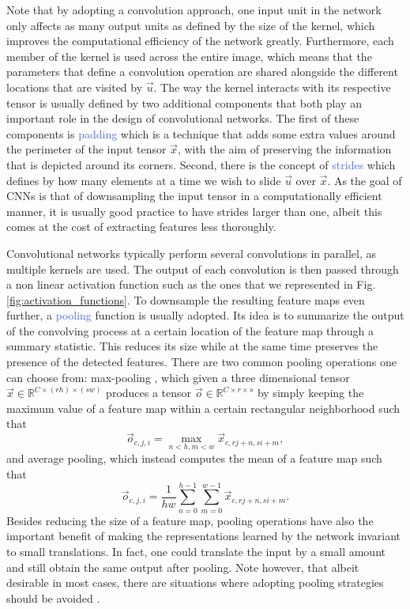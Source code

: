 Note that by adopting a convolution approach, one input unit in the network only affects as many output units as defined by the size of the kernel, which improves the computational efficiency of the network greatly. Furthermore, each member of the kernel is used across the entire image, which means that the parameters that define a convolution operation are shared alongside the different locations that are visited by $\vec{u}$. The way the kernel interacts with its respective tensor is usually defined by two additional components that both play an important role in the design of convolutional networks. The first of these components is \textcolor{RoyalBlue}{padding} which is a technique that adds some extra values around the perimeter of the input tensor $\vec{x}$, with the aim of preserving the information that is depicted around its corners. Second, there is the concept of \textcolor{RoyalBlue}{strides} which defines by how many elements at a time we wish to slide $\vec{u}$ over $\vec{x}$. As the goal of CNNs is that of downsampling the input tensor in a computationally efficient manner, it is usually good practice to have strides larger than one, albeit this comes at the cost of extracting features less thoroughly. 

Convolutional networks typically perform several convolutions in parallel, as multiple kernels are used. The output of each convolution is then passed through a non linear activation function such as the ones that we represented in Fig. \ref{fig:activation_functions}. To downsample the resulting feature maps even further, a \textcolor{RoyalBlue}{pooling} function is usually adopted. Its idea is to summarize the output of the convolving process at a certain location of the feature map through a summary statistic. This reduces its size while at the same time preserves the presence of the detected features. There are two common pooling operations one can choose from: max-pooling \cite{zhou1988computation}, which given a three dimensional tensor $\vec{x}\in\mathds{R}^{C\times(rh)\times(sw)}$ produces a tensor $\vec{o}\in\mathds{R}^{C\times r\times s}$ by simply keeping the maximum value of a feature map within a certain rectangular neighborhood such that 
\begin{equation}
	\vec{o}_{c,j,i} = \underset{n<h,m<w}{\max} \vec{x}_{c,rj+n,si+m},
\end{equation}
and average pooling, which instead computes the mean of a feature map such that 
\begin{equation}
	\vec{o}_{c,j,i} = \frac{1}{hw} \sum_{n=0}^{h-1}\sum_{m=0}^{w-1} \vec{x}_{c,rj+n,si+m}.
\end{equation}
Besides reducing the size of a feature map, pooling operations have also the important benefit of making the representations learned by the network invariant to small translations. In fact, one could translate the input by a small amount and still obtain the same output after pooling. Note however, that albeit desirable in most cases, there are situations where adopting pooling strategies should be avoided \cite{sabatelli2018learning, bidoiadeep}.  


